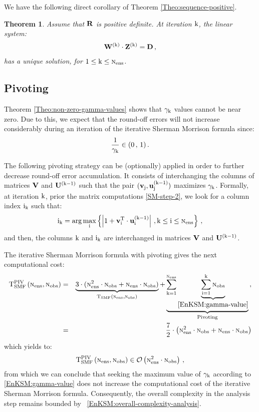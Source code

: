 \documentclass[12pt]{article}
\newtheorem{theorem}{Theorem}
\newcommand{\ind}{{\rm i_{\rm k}}}
\newcommand{\Nobs}{\textsc{n}_{{\rm obs}}}
\newcommand{\Nens}{\textsc{n}_{{\rm ens}}}
\newcommand{\BO}{{\mathcal O}}
\newcommand{\R}{{\bf R}}
\newcommand{\sZ}[1]{{\bf Z}^{\left(\rm #1 \right)}}
\newcommand{\U}[1]{{\bf U}^{\left ( \rm #1 \right)}}
\renewcommand{\u}[2]{{\bf u}_{\rm #1}^{(\rm #2)}}
\newcommand{\D}{{\bf D}}
\newcommand{\W}[1]{{{\bf W}^{\left ( {\rm #1} \right )}}}
\newcommand{\V}{{\bf V}}
\renewcommand{\v}[1]{{\bf v}_{{\rm #1}}}
\renewcommand{\k}{{\rm k}}
\newcommand{\T}[3]{{\rm T_{\rm #3} \left( #1,#2 \right )}}
\begin{document}
We have the following direct corollary of Theorem \ref{Theo:sequence-positive}.

\begin{theorem}
\label{Theo:sequence-non-singular}
Assume that $\R$ is positive definite. At iteration $\k$, the linear system:
\begin{eqnarray}
\label{EnKSM:sub-linear-system-to-solve}
\displaystyle \W{\k} \cdot \sZ{\k} = \D\, ,
\end{eqnarray}
has a unique solution, for $1 \le \k \le \Nens$.
\end{theorem}




\subsection{Pivoting}
\label{pivoting}


Theorem \ref{Theo:non-zero-gamma-values} shows that $\gamma_{\k}$ values cannot be near zero. Due to this, we expect that the round-off errors will not increase considerably during an iteration of the iterative Sherman Morrison formula since:
\begin{eqnarray*}
\displaystyle \frac{1}{\gamma_{\k}} \in (0\,,\,1)\,.
\end{eqnarray*}

The following pivoting strategy can be (optionally) applied in order to further decrease round-off error accumulation. It consists of interchanging the columns of matrices $\V$ and $\U{k-1}$ such that the pair $ ( \v{\rm j},\u{\rm j}{\k-1} )$ maximizes $\gamma_{\k}$. Formally, at iteration $\k$, prior the matrix computations \eqref{SM-step-2}, we look for a column index $\ind$ such that:
\begin{eqnarray}
\label{EnKSM:gamma-value}
\displaystyle \ind = \arg \max_{\substack{\rm i}} \left \{ \left | 1+\v{\rm i}^{\rm T} \cdot \u{\rm i}{\k-1} \right |\, , \k \le {\rm i} \le \Nens \right \}\,,
\end{eqnarray}
and then, the columns $\k$ and $\ind$ are interchanged in matrices $\V$ and $\U{\k-1}$. 

The iterative Sherman Morrison formula with pivoting gives the next computational cost:
\begin{eqnarray*} \nonumber
{\rm T}_{\rm SMF}^{\rm PIV} \left ( {\Nens},{\Nobs} \right ) &=& \underbrace{3 \cdot ( \Nens^2 \cdot \Nobs + \Nens \cdot \Nobs)}_{\T{\Nens}{\Nobs}{SMF}} + \underbrace{\sum_{\k=1}^{\Nens} \underbrace{\sum_{\rm i=1}^{\k} \Nobs}_{\eqref{EnKSM:gamma-value}}}_{\text{Pivoting}}\,, \\
&=& \frac{7}{2} \cdot \left( \Nens^2 \cdot \Nobs + \Nens \cdot \Nobs \right )
\end{eqnarray*}
which yields to:
\begin{eqnarray*}
{\rm T}_{\rm SMF}^{\rm PIV} \left ( {\Nens},{\Nobs} \right ) \in \BO \left( \Nens^2 \cdot \Nobs \right )\, ,
\end{eqnarray*}
from which we can conclude that seeking the maximum value of $\gamma_{\k}$ according to \eqref{EnKSM:gamma-value} does not increase the computational cost of the iterative Sherman Morrison formula. Consequently, the overall complexity in the analysis step remains bounded by ~\eqref{EnKSM:overall-complexity-analysis}. 
\end{document}
